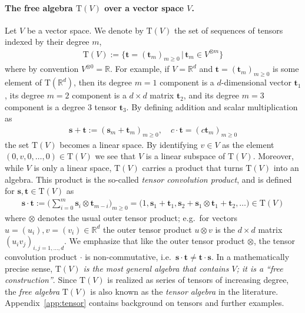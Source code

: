 \documentclass{article} \usepackage{iclr2021_conference,times}
\newcommand{\R}{\mathbb{R}}
\newcommand{\T}[1]{\mathrm{T}({#1})}
\newcommand{\bt}{\mathbf{t}}
\newcommand{\bs}{\mathbf{s}}
\theoremstyle{plain}
\theoremstyle{definition}
\begin{document}
\paragraph{The free algebra $\T{V}$ over a vector space $V$.}
Let $V$ be a vector space.
We denote by $\T{V}$ the set of sequences of tensors indexed by their degree $m$, 
\begin{align}
  \T{V} :=\{\bt=(\bt_m)_{m\ge 0}\,\vert\, \bt_m \in V^{\otimes m}\}\end{align}
where by convention $V^{\otimes 0}=\R$.
For example, if $V=\R^d$ and $\bt=(\bt_m)_{m\ge 0}$ is some element of $ \T{\R^d} $, then its degree $m=1$ component is a $ d $-dimensional vector $\bt_1$, its degree $m=2$ component is a $d\times d$ matrix $\bt_2$, and its degree $m=3$ component is a degree $ 3 $ tensor $\bt_3$.
By defining addition and scalar multiplication as
\begin{align}
\bs+\bt:=(\bs_m+\bt_m)_{m\geq 0}, \quad c\cdot \bt=(c \bt_m)_{m \ge 0}
\end{align}
the set $\T{V}$ becomes a linear space.
By identifying $v \in V$ as the element $(0,v,0,\ldots,0) \in \T{V}$ we see that $V$ is a linear subspace of $\T{V}$. 
Moreover, while $V$ is only a linear space, $\T{V}$ carries a product that turns $\T{V}$ into an algebra.
This product is the so-called \emph{tensor convolution product}, and is defined for $\bs,\bt \in \T{V}$ as
\begin{align} \label{eq:tensorprod}
\bs \cdot \bt := \big( \sum_{i=0}^m \bs_i\otimes \bt_{m-i} \big)_{m\geq 0} = \big( 1, \bs_1 + \bt_1, \bs_2 + \bs_1\otimes \bt_1 + \bt_2,\ldots \big) \in \T{V}
\end{align}
where $\otimes$ denotes the usual outer tensor product; e.g.~for vectors $u=(u_i),v=(v_i) \in \R^d$ the outer tensor product $u \otimes v$ is the $d\times d$ matrix $(u_iv_j)_{i,j=1,\ldots,d}$. 
We emphasize that like the outer tensor product $\otimes$, the tensor convolution product $\cdot$ is non-commutative, i.e.~$\bs \cdot \bt \neq \bt \cdot \bs$.
In a mathematically precise sense, \emph{$\T{V}$ is the most general algebra that contains $V$; it is a ``free construction''}. 
Since $\T{V}$ is realized as series of tensors of increasing degree, the \emph{free algebra} $\T{V}$ is also known as the \emph{tensor algebra} in the literature.
Appendix~\ref{app:tensor} contains background on tensors and further examples. 
\end{document}
